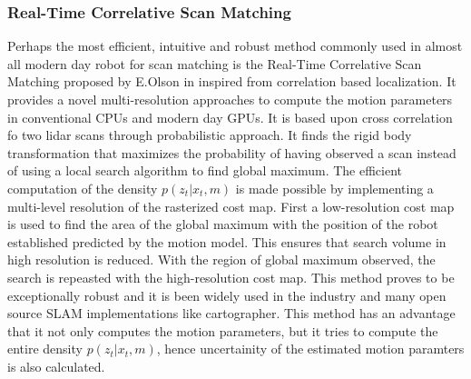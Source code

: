 \subsubsection{Real-Time Correlative Scan Matching}
    Perhaps the most efficient, intuitive and robust method commonly used in almost all modern day robot for scan matching is the Real-Time Correlative Scan Matching proposed by E.Olson in \cite{E.B.Olson} inspired from \cite{Konolige} 
correlation based localization. It provides a novel multi-resolution approaches to compute the motion parameters in conventional CPUs and modern day GPUs. It is based upon cross correlation fo two lidar scans through 
probabilistic approach. It finds the rigid body transformation that maximizes the probability of having observed a scan instead of using a local search algorithm to find global maximum. The efficient computation of the density
$p(z_t | x_t, m)$ is made possible by implementing a multi-level resolution of the rasterized cost map. First a low-resolution cost map is used to find the area of the global maximum with the position of the robot
established predicted by the motion model. This ensures that search volume in high resolution is reduced. With the region of global maximum observed, the search is repeasted with the high-resolution 
cost map. This method proves to be exceptionally robust and it is been widely used in the industry and many open source SLAM implementations like cartographer. 
    This method has an advantage that it not only computes the motion parameters, but it tries to compute the entire density $p(z_t | x_t, m)$, hence uncertainity of the estimated motion paramters is also calculated.

